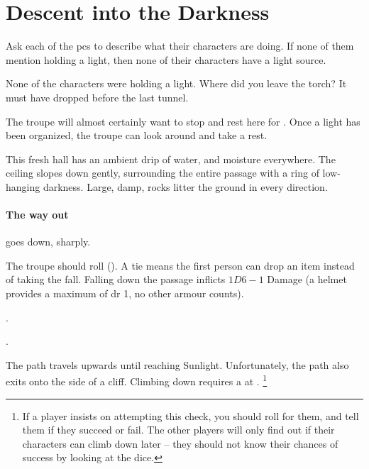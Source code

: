 \section{Descent into the Darkness}

\begin{multicols}{2}


Ask each of the \glspl{pc} to describe what their characters are doing.
If none of them mention holding a light, then none of their characters have a light source.

\begin{boxtext}
  None of the characters were holding a light.
  Where did you leave the torch?
  It must have dropped before the last tunnel.
\end{boxtext}

\noindent
The troupe will almost certainly want to stop and rest here for .
Once a light has been organized, the troupe can look around and take a rest.

\begin{boxtext}
  This fresh hall has an ambient drip of water, and moisture everywhere.
  The ceiling slopes down gently, surrounding the entire passage with a ring of low-hanging darkness.
  Large, damp, rocks litter the ground in every direction.
\end{boxtext}

\paragraph{The way out}
goes down, sharply.

The troupe should roll  (\tn[10]).
A tie means the first person can drop an item instead of taking the fall.
Falling down the passage inflicts $1D6-1$ Damage (a helmet provides a maximum of \gls{dr} 1, no other armour counts).

.

.


The path travels upwards until reaching Sunlight.
Unfortunately, the path also exits onto the side of a cliff.
Climbing down requires a  at \tn[14].%
\footnote{If a player insists on attempting this check, you should roll for them, and tell them if they succeed or fail.  The other players will only find out if their characters can climb down later -- they should not know their chances of success by looking at the dice.}


\end{multicols}
